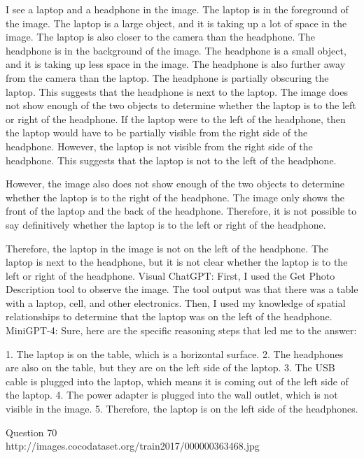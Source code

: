 \begin{enumerate}
    I see a laptop and a headphone in the image.
    The laptop is in the foreground of the image. The laptop is a large object, and it is taking up a lot of space in the image. The laptop is also closer to the camera than the headphone.
    The headphone is in the background of the image. The headphone is a small object, and it is taking up less space in the image. The headphone is also further away from the camera than the laptop.
    The headphone is partially obscuring the laptop. This suggests that the headphone is next to the laptop.
    The image does not show enough of the two objects to determine whether the laptop is to the left or right of the headphone.
    If the laptop were to the left of the headphone, then the laptop would have to be partially visible from the right side of the headphone. However, the laptop is not visible from the right side of the headphone. This suggests that the laptop is not to the left of the headphone.
    
    However, the image also does not show enough of the two objects to determine whether the laptop is to the right of the headphone. The image only shows the front of the laptop and the back of the headphone. Therefore, it is not possible to say definitively whether the laptop is to the left or right of the headphone.
    
    Therefore, the laptop in the image is not on the left of the headphone. The laptop is next to the headphone, but it is not clear whether the laptop is to the left or right of the headphone.
    \subitem Visual ChatGPT: First, I used the Get Photo Description tool to observe the image. The tool output was that there was a table with a laptop, cell, and other electronics. Then, I used my knowledge of spatial relationships to determine that the laptop was on the left of the headphone.
    \subitem MiniGPT-4: Sure, here are the specific reasoning steps that led me to the answer:

    1. The laptop is on the table, which is a horizontal surface.
    2. The headphones are also on the table, but they are on the left side of the laptop.
    3. The USB cable is plugged into the laptop, which means it is coming out of the left side of the laptop.
    4. The power adapter is plugged into the wall outlet, which is not visible in the image.
    5. Therefore, the laptop is on the left side of the headphones.
\end{enumerate}
Question 70\\
http://images.cocodataset.org/train2017/000000363468.jpg

